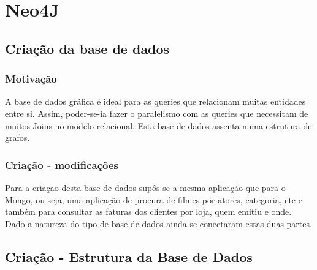 \newpage
\section{Neo4J}

\subsection{Criação da base de dados}

\subsubsection{Motivação}\hfill
\newline
\par A base de dados gráfica é ideal para as queries que relacionam muitas entidades entre si. Assim, poder-se-ia fazer o paralelismo com as queries que necessitam de muitos Joins no modelo relacional.
Esta base de dados assenta numa estrutura de grafos.

\subsubsection{Criação - modificações}\hfill
\newline
\par Para a criaçao desta base de dados supôs-se a mesma aplicação que para o Mongo, ou seja, uma aplicação de procura de filmes por atores, categoria, etc e também para consultar as faturas dos clientes por loja, quem emitiu e onde. Dado a natureza do tipo de base de dados ainda se conectaram estas duas partes.

\subsection{Criação - Estrutura da Base de Dados}

